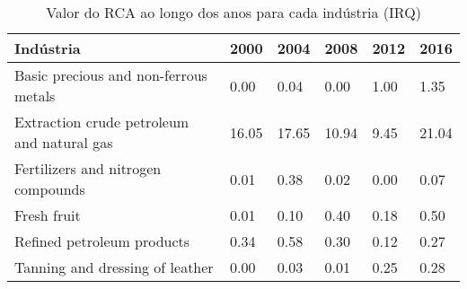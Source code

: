 \begin{table}
\centering
\caption{Valor do RCA ao longo dos anos para cada indústria (IRQ)}
\label{tab:ex3-tempo-IRQ}
\begin{tabular}{p{6cm}p{1.5cm}p{1.5cm}p{1.5cm}p{1.5cm}p{1.5cm}}
\toprule
                                 Indústria &  2000 &  2004 &  2008 & 2012 &  2016 \\
\midrule
     Basic precious and non-ferrous metals &  0.00 &  0.04 &  0.00 & 1.00 &  1.35 \\
Extraction crude petroleum and natural gas & 16.05 & 17.65 & 10.94 & 9.45 & 21.04 \\
        Fertilizers and nitrogen compounds &  0.01 &  0.38 &  0.02 & 0.00 &  0.07 \\
                               Fresh fruit &  0.01 &  0.10 &  0.40 & 0.18 &  0.50 \\
                Refined petroleum products &  0.34 &  0.58 &  0.30 & 0.12 &  0.27 \\
           Tanning and dressing of leather &  0.00 &  0.03 &  0.01 & 0.25 &  0.28 \\
\bottomrule
\end{tabular}
\end{table}
